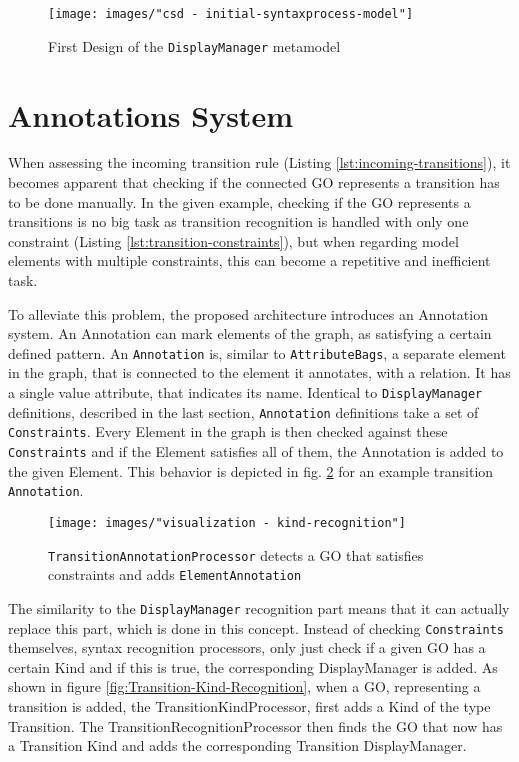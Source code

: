 \begin{figure}
\centering
\texttt{[image: images/"csd - initial-syntaxprocess-model"]}
\caption{First Design of the \texttt{DisplayManager} metamodel}
\label{fig:initial-syntax-model}
\end{figure}


\section{Annotations System}
When assessing the incoming transition rule (Listing \ref{lst:incoming-transitions}), it becomes apparent that checking if the connected GO represents a transition has to be done manually. In the given example, checking if the GO represents a transitions is no big task as transition recognition is handled with only one constraint (Listing \ref{lst:transition-constraints}), but when regarding model elements with multiple constraints, this can become a repetitive and inefficient task. 

To alleviate this problem, the proposed architecture introduces an Annotation system. An Annotation can mark elements of the graph, as satisfying a certain defined pattern. An \texttt{Annotation} is, similar to \texttt{AttributeBags}, a separate element in the graph, that is connected to the element it annotates, with a relation. It has a single value attribute, that indicates its name. Identical to \texttt{DisplayManager} definitions, described in the last section, \texttt{Annotation} definitions take a set of \texttt{Constraints}. Every Element in the graph is then checked against these \texttt{Constraints} and if the Element satisfies all of them, the Annotation is added to the given Element. This behavior is depicted in fig. \ref{fig:kind-recognition} for an example transition \texttt{Annotation}.

\begin{figure}
  \centering
  \texttt{[image: images/"visualization - kind-recognition"]}
  \caption{\texttt{TransitionAnnotationProcessor} detects a GO that satisfies constraints and adds \texttt{ElementAnnotation}}
  \label{fig:kind-recognition}
\end{figure}

The similarity to the \texttt{DisplayManager} recognition part means that it can actually replace this part, which is done in this concept. Instead of checking \texttt{Constraints} themselves, syntax recognition processors, only just check if a given GO has a certain Kind and if this is true, the corresponding DisplayManager is added. As shown in figure \ref{fig:Transition-Kind-Recognition}, when a GO, representing a transition is added, the TransitionKindProcessor, first adds a Kind of the type Transition. The TransitionRecognitionProcessor then finds the GO that now has a Transition Kind and adds the corresponding Transition DisplayManager.


